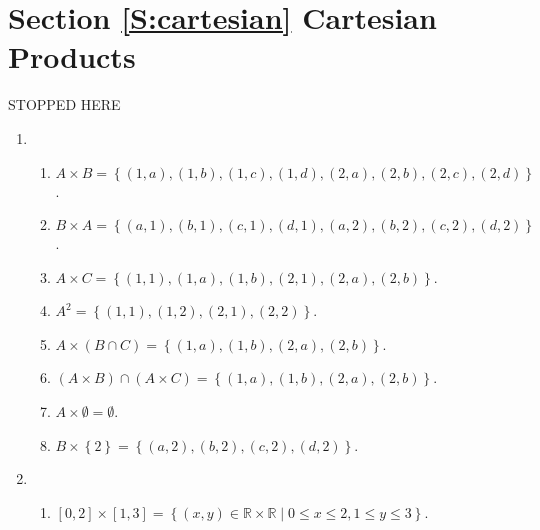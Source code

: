 \section*{Section \ref{S:cartesian} Cartesian Products}

STOPPED HERE

\begin{enumerate}
\item \begin{enumerate}
\item $A \times B = \left\{ {\left( {1, a} \right), \left( {1, b} \right), \left( {1, c} \right), \left( {1, d} \right), \left( {2, a} \right), \left( {2, b} \right), \left( {2, c} \right), \left( {2, d} \right)} \right\}$.

\item $B \times A = \left\{ {\left( {a, 1} \right), \left( {b, 1} \right), \left( {c, 1} \right), \left( {d, 1} \right), \left( {a, 2} \right), \left( {b, 2} \right), \left( {c, 2} \right), \left( {d, 2} \right)} \right\}$.

\item $A \times C = \left\{ { \left( 1, 1 \right), \left( {1, a} \right), \left( {1, b} \right), \left( 2, 1 \right), \left( {2, a} \right), \left( {2, b} \right)} \right\}$.

\item $A^2 = \left\{ \left( 1, 1 \right), \left( 1, 2 \right), \left( 2, 1 \right), \left( 2, 2 \right) \right\}$.

\item $A \times \left( {B \cap C} \right) = \left\{ {\left( {1, a} \right), \left( {1, b} \right), \left( {2, a} \right), \left( {2, b} \right)} \right\}$.

\item $\left( A \times B \right) \cap \left( A \times C \right) = 
\left\{ {\left( {1, a} \right), \left( {1, b} \right), \left( {2, a} \right), \left( {2, b} \right)} \right\}$.

\item $A \times \emptyset = \emptyset$.

\item $B \times \left\{ 2 \right\} = \left\{ \left( a, 2 \right), \left( b, 2 \right), 
\left( c, 2 \right), \left( d, 2 \right) \right\}$.
\end{enumerate}

\item \begin{enumerate}
\item $\left[ 0, 2 \right] \times \left[ 1, 3 \right] = \left\{ \left( x, y \right) \in \mathbb{R} \times \mathbb{R} \mid 0 \leq x \leq 2, 1 \leq y \leq 3 \right\}$.


\end{enumerate}
\end{enumerate}
